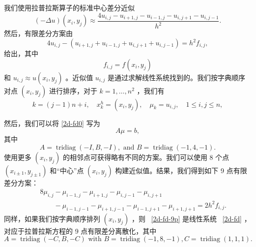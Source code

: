 \documentclass[12pt]{acta_2011xz}
\begin{document}
我们使用拉普拉斯算子的标准中心差分近似
   \[
(-\Delta u)(x_i,y_j) \approx   
\frac{4u_{i,j}-u_{i+1,j}-u_{i-1,j}-u_{i,j+1}-u_{i,j-1}}{h^2}.
\]    然后，有限差分方案由
   \begin{equation}
  \label{2d-fd0}
4u_{i,j}-(u_{i+1,j}+u_{i-1,j}+u_{i,j+1}+u_{i,j-1})=h^2f_{i,j},
\end{equation}    给出，其中
   \begin{equation}
  \label{fij-fd}
f_{i,j} = f(x_i, y_j) 
\end{equation}    和    $u_{i,j} \approx u(x_i,y_j)$    。近似值    $u_{i,j}$    是通过求解线性系统找到的。我们按字典顺序对点    $(x_i,y_j)$    进行排序，对于    $k=1, \dots, n^2$    ，我们有
   \begin{equation}
  \label{lexi}
k=(j-1)n+i,  \quad x^h_{k}=(x_i,y_j), \quad \mu_k=u_{i,j},\quad 1\le i,j\le n, 
\end{equation}     

然后，我们可以将    \eqref{2d-fd0}    写为
   \begin{equation}\label{2d-fd}
A\mu=b,
\end{equation}    其中
   \begin{equation}
  \label{iso-A}
A=\operatorname{tridiag} (-I, B, -I), \mbox{ and }
B=\operatorname{tridiag} (-1, 4, -1). 
\end{equation}    使用更多    $(x_i, y_j)$    的相邻点可获得略有不同的方案。我们可以使用 8 个点    $(x_{i\pm 1}, y_{j\pm 1})$    和“中心”点    $(x_i, y_j)$    构建近似值。结果，我们得到如下 9 点有限差分方案：
   \begin{eqnarray}
 &&   8\mu_{i,j} - \mu_{i-1, j}-\mu_{i+1, j}-\mu_{i, j-1}-\mu_{i, j+1}
    \label{2d-fd-9p}  \\  \label{9-point}
&&\phantom{8\mu_{i,j}} - \mu_{i-1, j-1} -\mu_{i+1, j-1}-\mu_{i-1, j+1}-\mu_{i+1,j+1}=2h^2f_{i,j}. 
\nonumber
\end{eqnarray}    同样，如果我们按字典顺序排列    $(x_i, y_j)$   ，则~    \eqref{2d-fd-9p}    是线性系统~    \eqref{2d-fd}   ，对应于拉普拉斯方程的 9 点有限差分离散化，其中
   \begin{equation}
  \label{9point}
A=\operatorname{tridiag}(-C, B, -C) \mbox{ with }
B=\operatorname{tridiag}(-1, 8,-1), C=\operatorname{tridiag}(1, 1,1).
\end{equation}     
\end{document}
